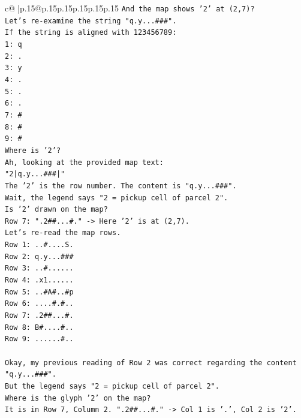 \documentclass{article}
\begin{document}
{\begin{supertabular}{c@{$\;$}|p{.15\linewidth}@{}p{.15\linewidth}p{.15\linewidth}p{.15\linewidth}p{.15\linewidth}p{.15\linewidth}}
{{{\texttt{And the map shows '2' at (2,7)?} \\
\texttt{Let's re{-}examine the string "q.y...\#\#\#".} \\
\texttt{If the string is aligned with 123456789:} \\
\texttt{1: q} \\
\texttt{2: .} \\
\texttt{3: y} \\
\texttt{4: .} \\
\texttt{5: .} \\
\texttt{6: .} \\
\texttt{7: \#} \\
\texttt{8: \#} \\
\texttt{9: \#} \\
\texttt{Where is '2'?} \\
\texttt{Ah, looking at the provided map text:} \\
\texttt{"2|q.y...\#\#\#|"} \\
\texttt{The '2' is the row number. The content is "q.y...\#\#\#".} \\
\texttt{Wait, the legend says "2 = pickup cell of parcel 2".} \\
\texttt{Is '2' drawn on the map?} \\
\texttt{Row 7: ".2\#\#...\#." {-}> Here '2' is at (2,7).} \\
\texttt{Let's re{-}read the map rows.} \\
\texttt{Row 1: ..\#....S.} \\
\texttt{Row 2: q.y...\#\#\#} \\
\texttt{Row 3: ..\#......} \\
\texttt{Row 4: .x1......} \\
\texttt{Row 5: ..\#A\#..\#p} \\
\texttt{Row 6: ....\#.\#..} \\
\texttt{Row 7: .2\#\#...\#.} \\
\texttt{Row 8: B\#....\#..} \\
\texttt{Row 9: ......\#..} \\
\\ 
\texttt{Okay, my previous reading of Row 2 was correct regarding the content "q.y...\#\#\#".} \\
\texttt{But the legend says "2 = pickup cell of parcel 2".} \\
\texttt{Where is the glyph '2' on the map?} \\
\texttt{It is in Row 7, Column 2. ".2\#\#...\#." {-}> Col 1 is '.', Col 2 is '2'.} \\
}}}
\end{supertabular}}
\end{document}
